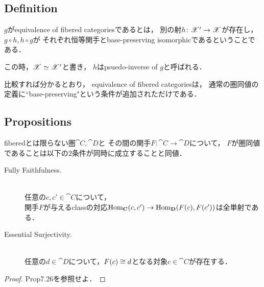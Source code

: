 \documentclass[a4paper, dvipdfmx]{jsarticle}
\begin{document}
\subsection{Definition}
    \begin{Def}[Equivalence]
        $g$がequivalence of fibered categoriesであるとは，
        別の射$h \colon \mathscr{X}' \to \mathscr{X}$が存在し，
        $g \circ h, h \circ g$が
        それぞれ恒等関手とbase-preserving isomorphicであるということである．

        この時，$\mathscr{X} \simeq \mathscr{X}'$と書き，
        $h$はpsuedo-inverse of $g$と呼ばれる．
    \end{Def}
    \begin{Remark}
        比較すれば分かるとおり，
        equivalence of fibered categoriesは，
        通常の圏同値の定義に``base-preserving"という条件が追加されただけである．
    \end{Remark}

\subsection{Propositions}
    \begin{Prop}
        fiberedとは限らない圏$\cat{C}, \cat{D}$と
        その間の関手$F \colon \cat{C} \to \cat{D}$について，
        $F$が圏同値であることは以下の$2$条件が同時に成立することと同値．
        \begin{description}
            \item[Fully Faithfulness.] \mbox{}\\
                任意の$c,c' \in \cat{C}$について，\mbox{}\\
                関手$F$が与えるclassの対応$\operatorname{Hom}_{\mathbf{C}}(c, c') \to \operatorname{Hom}_{\mathbf{D}}(F(c), F(c'))$は全単射である．

            \item[Essential Surjectivity.] \mbox{}\\
                任意の$d \in \cat{D}$について，$F(c) \cong d$となる対象$c \in \cat{C}$が存在する．
        \end{description}
    \end{Prop}
    \begin{proof}
        \cite{Awodey} Prop7.26を参照せよ．
    \end{proof}
\end{document}
